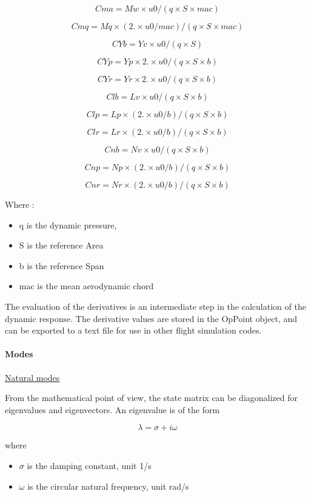 \documentclass[a4paper,twoside,12pt,dvips]{article}
\begin{document}
$$Cma = Mw \times u0 / (q \times S \times mac)$$

$$Cmq = Mq \times (2. \times u0 / mac) / (q \times S \times mac)$$

$$CYb = Yv \times u0 / (q \times S)$$

$$CYp = Yp \times  2. \times u0 / (q \times S \times b)$$

$$CYr = Yr \times  2. \times u0 / (q \times S \times b)$$

$$Clb = Lv \times u0 / (q \times S \times b)$$

$$Clp = Lp \times (2. \times u0 / b) /(q \times S \times b)$$

$$Clr = Lr \times (2. \times u0 / b) /(q \times S \times b)$$

$$Cnb = Nv \times u0 / (q \times S \times b)$$

$$Cnp = Np \times (2. \times u0 / b) /(q \times S \times b)$$

$$Cnr = Nr \times (2. \times u0 / b) /(q \times S \times b)$$

Where :

\begin{itemize}
\item q is the dynamic pressure,
\item S is the reference Area
\item b is the reference Span
\item mac is the mean aerodynamic chord
\end{itemize}

The evaluation of the derivatives is an intermediate step in the
calculation of the dynamic response. The derivative values are stored
in the OpPoint object, and can be exported to a text file for use in
other flight simulation codes.

\paragraph{Modes}

\underline{Natural modes}

From the mathematical point of view, the state matrix can be
diagonalized for eigenvalues and eigenvectors. An eigenvalue is of the
form

$$\lambda = \sigma + i \omega $$

where

\begin{itemize}
\item $\sigma$ is the damping constant, unit 1/s
\item $\omega$ is the circular natural frequency, unit rad/s
\end{itemize}
\end{document}
